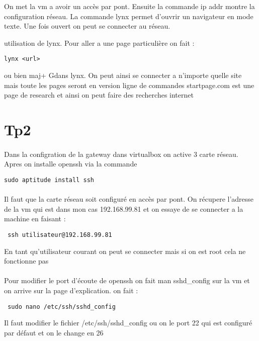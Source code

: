 \documentclass[a4paper,12pt]{article}
\begin{document}
On met la vm a avoir un accès par pont. Ensuite la commande ip addr montre la configuration réseau.
La commande lynx permet d'ouvrir un navigateur en mode texte.
Une fois ouvert on peut se connecter au réseau.
 
utilisation de lynx. Pour aller a une page particulière on fait :
\begin{verbatim}
lynx <url>
\end{verbatim}
 ou bien maj+ Gdans lynx.
On peut ainsi se connecter a n'importe quelle site mais toute les pages seront en version ligne de commandes
startpage.com est une page de research et ainsi on peut faire des recherches internet



\section{Tp2}

\paragraph{}
Dans la configration de la gateway dans virtualbox on active 3 carte réseau.
Apres on installe openssh via la commande 
\begin{verbatim}
sudo aptitude install ssh 
\end{verbatim}

\paragraph{}
Il faut que la carte réseau soit configuré en accès par pont.
On récupere l'adresse de la vm qui est dans mon cas 192.168.99.81 et on essaye de se connecter a la machine en faisant :
\begin{verbatim}
 ssh utilisateur@192.168.99.81
\end{verbatim}
En tant qu'utilisateur courant on peut se connecter mais si on est root cela ne fonctionne pas
\paragraph{}
Pour modifier le port d'écoute de openssh on fait man sshd\_config sur la vm et on arrive sur la page d'explication.
on fait :
\begin{verbatim}
 sudo nano /etc/ssh/sshd_config
\end{verbatim}
Il faut modifier le fichier /etc/ssh/sshd_config ou on le port 22 qui est configuré par défaut et on le change en 26
\end{document}
